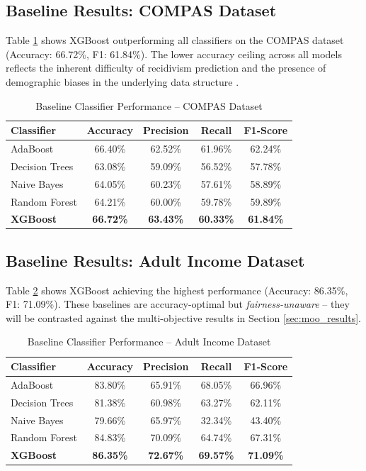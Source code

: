 \documentclass[12pt,a4paper]{article}
\begin{document}
\subsection{Baseline Results: COMPAS Dataset}

Table \ref{tab:baseline_compas} shows XGBoost outperforming all classifiers on the COMPAS dataset (Accuracy: 66.72\%, F1: 61.84\%). The lower accuracy ceiling across all models reflects the inherent difficulty of recidivism prediction and the presence of demographic biases in the underlying data structure \cite{angwin2016machine}.

\begin{table}[h]
\centering
\caption{Baseline Classifier Performance -- COMPAS Dataset}
\label{tab:baseline_compas}
\begin{tabular}{lcccc}
\toprule
\textbf{Classifier} & \textbf{Accuracy} & \textbf{Precision} & \textbf{Recall} & \textbf{F1-Score} \\
\midrule
AdaBoost        & 66.40\% & 62.52\% & 61.96\% & 62.24\% \\
Decision Trees  & 63.08\% & 59.09\% & 56.52\% & 57.78\% \\
Naive Bayes     & 64.05\% & 60.23\% & 57.61\% & 58.89\% \\
Random Forest   & 64.21\% & 60.00\% & 59.78\% & 59.89\% \\
\textbf{XGBoost} & \textbf{66.72\%} & \textbf{63.43\%} & \textbf{60.33\%} & \textbf{61.84\%} \\
\bottomrule
\end{tabular}
\end{table}

\subsection{Baseline Results: Adult Income Dataset}

Table \ref{tab:baseline_adult} shows XGBoost achieving the highest performance (Accuracy: 86.35\%, F1: 71.09\%). These baselines are accuracy-optimal but \textit{fairness-unaware} -- they will be contrasted against the multi-objective results in Section \ref{sec:moo_results}.

\begin{table}[h]
\centering
\caption{Baseline Classifier Performance -- Adult Income Dataset}
\label{tab:baseline_adult}
\begin{tabular}{lcccc}
\toprule
\textbf{Classifier} & \textbf{Accuracy} & \textbf{Precision} & \textbf{Recall} & \textbf{F1-Score} \\
\midrule
AdaBoost        & 83.80\% & 65.91\% & 68.05\% & 66.96\% \\
Decision Trees  & 81.38\% & 60.98\% & 63.27\% & 62.11\% \\
Naive Bayes     & 79.66\% & 65.97\% & 32.34\% & 43.40\% \\
Random Forest   & 84.83\% & 70.09\% & 64.74\% & 67.31\% \\
\textbf{XGBoost} & \textbf{86.35\%} & \textbf{72.67\%} & \textbf{69.57\%} & \textbf{71.09\%} \\
\bottomrule
\end{tabular}
\end{table}
\end{document}
